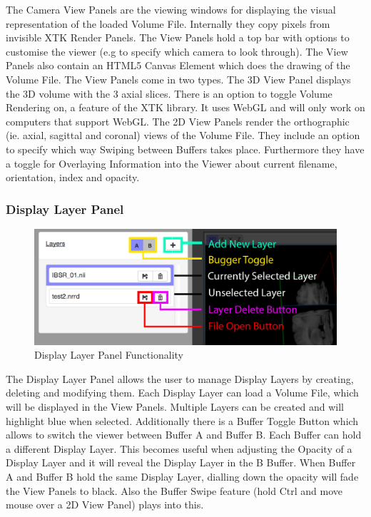 \documentclass[a4paper,11pt,twoside]{article}
\begin{document}
The Camera View Panels are the viewing windows for displaying the visual representation of the loaded Volume File. Internally they copy pixels from invisible XTK Render Panels. The View Panels hold a top bar with options to customise the viewer (e.g to specify which camera to look through). The View Panels also contain an HTML5 Canvas Element which does the drawing of the Volume File. The View Panels come in two types. The 3D View Panel displays the 3D volume with the 3 axial slices. There is an option to toggle Volume Rendering on, a feature of the XTK library. It uses WebGL and will only work on computers that support WebGL. The 2D View Panels render the orthographic (ie. axial, sagittal and coronal) views of the Volume File. They include an option to specify which way Swiping between Buffers takes place. Furthermore they have a toggle for Overlaying Information into the Viewer about current filename, orientation, index and opacity.




\subsubsection{Display Layer Panel}

\begin{figure}[ht!]
\centering
\includegraphics[width=140mm]{graphics/features_03.png}
\caption{Display Layer Panel Functionality}
\label{fig:UIdesign1}
\end{figure}

The Display Layer Panel allows the user to manage Display Layers by creating, deleting and modifying them. Each Display Layer can load a Volume File, which will be displayed in the View Panels. Multiple Layers can be created and will highlight blue when selected. Additionally there is a Buffer Toggle Button which allows to switch the viewer between Buffer A and Buffer B. Each Buffer can hold a different Display Layer. This becomes useful when adjusting the Opacity of a Display Layer and it will reveal the Display Layer in the B Buffer. When Buffer A and Buffer B hold the same Display Layer, dialling down the opacity will fade the View Panels to black. Also the Buffer Swipe feature (hold Ctrl and move mouse over a 2D View Panel) plays into this.
\end{document}
